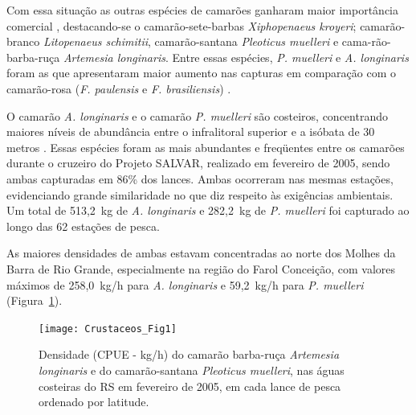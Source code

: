 \documentclass[a4paper,11pt,twoside,showtrims,onecolumn,openright,final]{memoir}
\begin{document}
Com essa situação as outras espécies de camarões ganharam maior importância 
comercial \citep{valentini1991b}, 
destacando-se o camarão-sete-barbas \emph{Xiphopenaeus kroyeri}; 
camarão-branco \emph{Litopenaeus schimitii}, 
camarão-santana \emph{Pleoticus muelleri} e 
cama-rão-barba-ruça \emph{Artemesia longinaris}.
Entre essas espécies, \emph{P. muelleri} e \emph{A. longinaris} 
foram as que apresentaram maior aumento nas capturas em comparação 
com o camarão-rosa (\emph{F. paulensis} e \emph{F. brasiliensis}) \citep{dincao2002}. 

O camarão \emph{A. longinaris} e o camarão \emph{P. muelleri} são costeiros, concentrando maiores 
níveis de abundância entre o infralitoral superior e a isóbata 
de 30 metros \citep{boschi1969,iwai1973a,iwai1973b}.
Essas espécies foram as mais abundantes e freqüentes entre os camarões durante 
o cruzeiro do Projeto SALVAR, realizado em fevereiro de 2005, sendo ambas capturadas 
em 86\% dos lances. Ambas ocorreram nas mesmas estações, evidenciando grande similaridade 
no que diz respeito às exigências ambientais. Um total de 513,2~kg de \emph{A. longinaris} 
e 282,2~kg de \emph{P. muelleri} foi capturado ao longo das 62 estações de pesca.

As maiores densidades de ambas estavam concentradas ao norte dos Molhes da Barra de Rio Grande, 
especialmente na região do Farol Conceição, com valores máximos de 258,0~kg/h 
para \emph{A. longinaris} e 59,2~kg/h para \emph{P. muelleri}  (Figura~\ref{fig:crustaceos1}).

%
%

\begin{figure}
\begin{center}
\texttt{[image: Crustaceos\_Fig1]}
\end{center}
\caption[Densidade do camarão barba-ruça \emph{Artemesia longinaris} 
         e do camarão-santana \emph{Pleoticus muelleri} nas águas costeiras do RS]
	{Densidade (CPUE - kg/h) do camarão barba-ruça \emph{Artemesia longinaris} 
         e do camarão-santana \emph{Pleoticus muelleri}, nas águas costeiras do RS 
         em fevereiro de 2005, em cada lance de pesca ordenado por latitude.}
\label{fig:crustaceos1}
\end{figure}

\end{document}
